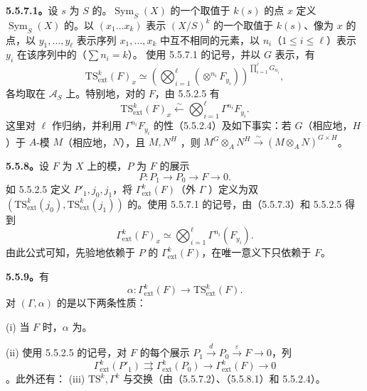 \textbf{5.5.7.1。}设 $s$ 为 $S$ 的。$\operatorname{Sym}_S(X)$ 的一个取值于 $k(s)$ 的点 $x$ 定义 $\operatorname{Sym}_S(X)$ 的。以 $(x_1\ldots x_k)$ 表示 $(X/S)^k$ 的一个取值于 $k(s)$、像为 $x$ 的点，以 $y_1,\ldots,y_\ell$ 表示序列 $x_1,\ldots,x_k$ 中互不相同的元素，以 $n_i$（$1\leq i\leq\ell$）表示 $y_i$ 在该序列中的（$\sum n_i=k$）。
使用 5.5.7.1 的记号，并以 $G$ 表示，有
\begin{equation}\tag{5.5.7.2}\mathrm{TS}^k_{\mathrm{ext}}(F)_x\simeq\left(\bigotimes_{i=1}^{\ell}(\mathop{\otimes}\nolimits^{n_i}F_{y_i})\right)^{\prod_{i=1}^{\ell}G_{n_i}},\end{equation}
各均取在 $\mathscr A_S$ 上。特别地，对的 $F$，由 5.5.2.5 有
\begin{equation}\tag{5.5.7.3}\mathrm{TS}^k_{\mathrm{ext}}(F)_x\xleftarrow\sim\bigotimes_{i=1}^{\ell}\Gamma^{n_i}F_{y_i}.\end{equation}
这里对 $\ell$ 作归纳，并利用 $\Gamma^{n_i}F_{y_i}$ 的性（5.5.2.4）及如下事实：若 $G$（相应地，$H$）于 $A$-模 $M$（相应地，$N$），且 $M,N^H$ ，则 $M^G\otimes_A N^H\xrightarrow\sim(M\otimes_A N)^{G\times H}$。

\textbf{5.5.8。}设 $F$ 为 $X$ 上的模，$P$ 为 $F$ 的展示
\[P:P_1\longrightarrow P_0\longrightarrow F\longrightarrow0.\]
如 5.5.2.5 定义 $P'_1,j_0,j_1$，将 $\Gamma^k_{\mathrm{ext}}(F)$（外 $\Gamma$ ）定义为双 $(\mathrm{TS}^k_{\mathrm{ext}}(j_0),\mathrm{TS}^k_{\mathrm{ext}}(j_1))$ 的。使用 5.5.7.1 的记号，由（5.5.7.3）和 5.5.2.5 得到
\begin{equation}\tag{5.5.8.1}\Gamma^k_{\mathrm{ext}}(F)_x\simeq\bigotimes_{i=1}^{\ell}\Gamma^{n_i}(F_{y_i}).\end{equation}
由此公式可知，先验地依赖于 $P$ 的 $\Gamma^k_{\mathrm{ext}}(F)$，在唯一意义下只依赖于 $F$。

\textbf{5.5.9。}有
\[\alpha:\Gamma^k_{\mathrm{ext}}(F)\longrightarrow\mathrm{TS}^k_{\mathrm{ext}}(F).\]
对 $(\Gamma,\alpha)$ 的是以下两条性质：

(i) 当 $F$ 时，$\alpha$ 为。

(ii) 使用 5.5.2.5 的记号，对 $F$ 的每个展示 $P_1\xrightarrow dP_0\xrightarrow\varepsilon F\to0$，列
\[\Gamma^k_{\mathrm{ext}}(P'_1)\rightrightarrows\Gamma^k_{\mathrm{ext}}(P_0)\longrightarrow\Gamma^k_{\mathrm{ext}}(F)\longrightarrow0\]
。此外还有：
(iii)  $\mathrm{TS}^k,\Gamma^k$ 与交换（由（5.5.7.2）、（5.5.8.1）和 5.5.2.4）。

